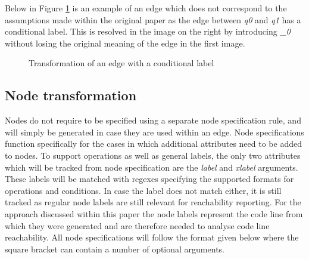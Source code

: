 \documentclass[12pt]{thesis}
\begin{document}
Below in Figure \ref{fig:edgetransformlabel} is an example of an edge which does not correspond to the assumptions made within the original paper as the edge between \textit{q0} and \textit{q1} has a conditional label. This is resolved in the image on the right by introducing \textit{\_0} without losing the original meaning of the edge in the first image.

\begin{figure}[h]%
	\centering
	\qquad
	\caption{Transformation of an edge with a conditional label}
	\label{fig:edgetransformlabel}
\end{figure}

\subsection{Node transformation}
Nodes do not require to be specified using a separate node specification rule, and will simply be generated in case they are used within an edge. Node specifications function specifically for the cases in which additional attributes need to be added to nodes. To support operations as well as general labels, the only two attributes which will be tracked from node specification are the \textit{label} and \textit{xlabel} arguments. These labels will be matched with regexes specifying the supported formats for operations and conditions. In case the label does not match either, it is still tracked as regular node labels are still relevant for reachability reporting. For the approach discussed within this paper the node labels represent the code line from which they were generated and are therefore needed to analyse code line reachability. All node specifications will follow the format given below where the square bracket can contain a number of optional arguments.
\end{document}
